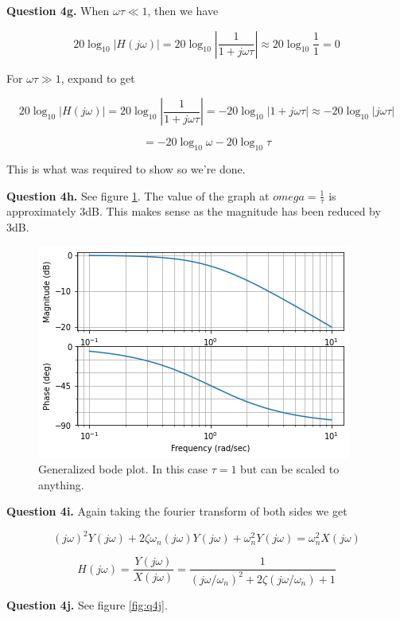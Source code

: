 \documentclass[letterpaper, reqno,11pt]{article}
\begin{document}
{\noindent\bf Question 4g.} When $\omega\tau\ll1$, then we have 

\[
    20\log_{10}|H(j\omega)|=20\log_{10}|\frac1{1+j\omega\tau}|\approx 20\log_{10}\frac{1}{1}=0
\]

For $\omega\tau\gg1$, expand to get 

\[
    20\log_{10}|H(j\omega)|=20\log_{10}|\frac1{1+j\omega\tau}|=-20\log_{10}|1+j\omega\tau|\approx-20\log_{10}|j\omega\tau|
\]

\[
    =-20\log_{10}\omega-20\log_{10}\tau
\]

This is what was required to show so we're done. 

{\noindent\bf Question 4h.} See figure \ref{fig:q4h}. The value of the graph at $omega=\frac1\tau$ is approximately $3$dB. This makes sense as the magnitude has been reduced by 3dB. 

\begin{figure}[htbp]
\centering
\includegraphics[width=\textwidth]{q4h}
\caption{Generalized bode plot. In this case $\tau=1$ but can be scaled to anything. }
\label{fig:q4h}
\end{figure}

{\noindent\bf Question 4i.} Again taking the fourier transform of both sides we get 

\[
    (j\omega)^2Y(j\omega)+2\zeta\omega_n(j\omega) Y(j\omega)+\omega_n^2Y(j\omega)=\omega_n^2X(j\omega)
\]

\[
    H(j\omega)=\frac{Y(j\omega)}{X(j\omega)}=\frac1{(j\omega/\omega_n)^2+2\zeta(j\omega/\omega_n)+1}
\]

{\noindent\bf Question 4j.} See figure \ref{fig:q4j}. 
\end{document}

